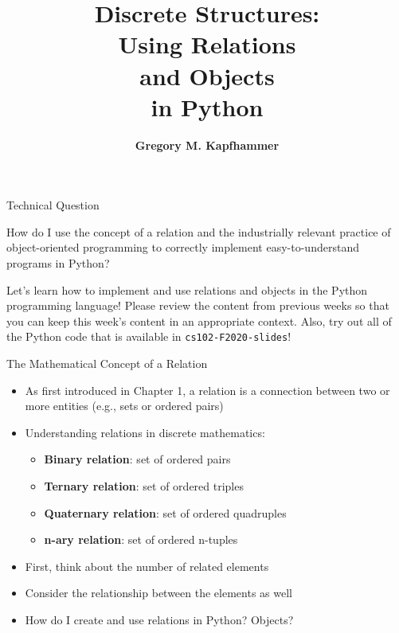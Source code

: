 \documentclass[14pt,aspectratio=169]{beamer}
\title{\vspace*{-.25in}Discrete Structures: \\ Using Relations\\ and Objects\\ in Python}
\author{{\bf Gregory M. Kapfhammer}}
\institute[shortinst]{{\bf Department of Computer Science, Allegheny College}}
\begin{document}
{
  \begin{frame}
    \titlepage
  \end{frame}
}

%
\begin{frame}{Technical Question}
  \hspace*{.25in}
  \begin{minipage}{5in}
    \vspace*{.1in}
    \begin{center}
      {\large How do I use the concept of a relation and the industrially
      relevant practice of object-oriented programming to correctly implement
      easy-to-understand programs in Python?}
    \end{center}
  \end{minipage}
  \vspace{2ex}
  \begin{center}
    \small Let's learn how to implement and use relations and objects in the
    Python programming language! Please review the content from previous weeks
    so that you can keep this week's content in an appropriate context. Also,
    try out all of the Python code that is available in {\tt cs102-F2020-slides}!
  \end{center}
\end{frame}

%
\begin{frame}{The Mathematical Concept of a Relation}
  \begin{itemize}
    \item As first introduced in Chapter 1, a relation is a connection between
      two or more entities (e.g., sets or ordered pairs)
      \vspace*{-.15in}
    \item Understanding relations in discrete mathematics:
      \begin{itemize}
        \item {\bf Binary relation}: set of ordered pairs
        \item {\bf Ternary relation}: set of ordered triples
        \item {\bf Quaternary relation}: set of ordered quadruples
        \item {\bf n-ary relation}: set of ordered n-tuples
      \end{itemize}
      \vspace*{-.2in}
    \item First, think about the number of related elements
      \vspace*{-.2in}
    \item Consider the relationship between the elements as well
      \vspace*{-.2in}
    \item How do I create and use relations in Python? Objects?
  \end{itemize}
\end{frame}
\end{document}
